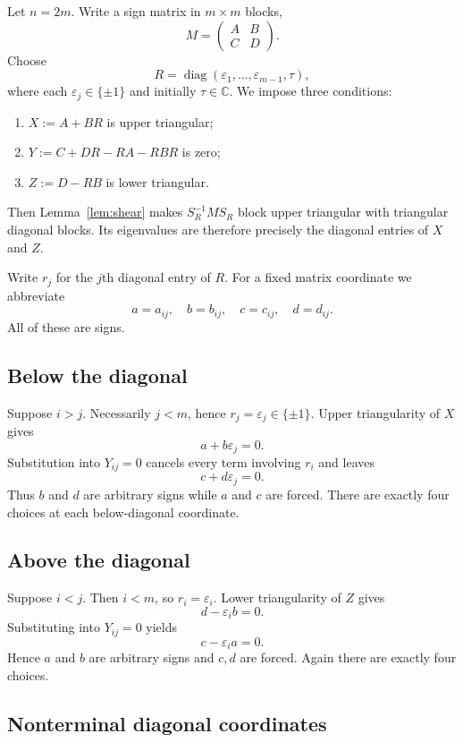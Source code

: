 \documentclass[11pt]{article}
\theoremstyle{remark}
\newcommand{\C}{\mathbb C}
\newcommand{\diag}{\operatorname{diag}}
\begin{document}
Let $n=2m$.  Write a sign matrix in $m\times m$ blocks,
\[
 M=\begin{pmatrix}A&B\\ C&D\end{pmatrix}.
\]
Choose
\[
 R=\diag(\varepsilon_1,\ldots,\varepsilon_{m-1},\tau),
\]
where each $\varepsilon_j\in\{\pm1\}$ and initially $\tau\in\C$.  We impose three conditions:
\begin{enumerate}
\item $X:=A+BR$ is upper triangular;
\item $Y:=C+DR-RA-RBR$ is zero;
\item $Z:=D-RB$ is lower triangular.
\end{enumerate}
Then Lemma~\ref{lem:shear} makes $S_R^{-1}MS_R$ block upper triangular with triangular diagonal blocks.  Its eigenvalues are therefore precisely the diagonal entries of $X$ and $Z$.

Write $r_j$ for the $j$th diagonal entry of $R$.  For a fixed matrix coordinate we abbreviate
\[
 a=a_{ij},\quad b=b_{ij},\quad c=c_{ij},\quad d=d_{ij}.
\]
All of these are signs.

\subsection{Below the diagonal}

Suppose $i>j$.  Necessarily $j<m$, hence $r_j=\varepsilon_j\in\{\pm1\}$.  Upper triangularity of $X$ gives
\[
 a+b\varepsilon_j=0.
\]
Substitution into $Y_{ij}=0$ cancels every term involving $r_i$ and leaves
\[
 c+d\varepsilon_j=0.
\]
Thus $b$ and $d$ are arbitrary signs while $a$ and $c$ are forced.  There are exactly four choices at each below-diagonal coordinate.

\subsection{Above the diagonal}

Suppose $i<j$.  Then $i<m$, so $r_i=\varepsilon_i$.  Lower triangularity of $Z$ gives
\[
 d-\varepsilon_i b=0.
\]
Substituting into $Y_{ij}=0$ yields
\[
 c-\varepsilon_i a=0.
\]
Hence $a$ and $b$ are arbitrary signs and $c,d$ are forced.  Again there are exactly four choices.

\subsection{Nonterminal diagonal coordinates}
\end{document}
